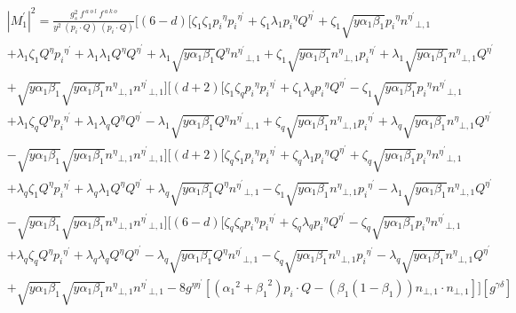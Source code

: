 \begin{equation}
\begin{split}
&{|{M}^{\prime}_1|}^2 =\frac{g_s^2 \:f^{\:a\:o\:l}\: f^{\:a\:k\:o}}{y^2\:(p_i\cdot Q) \:(p_i\cdot Q)} 
[(6-d)[\zeta_1 \zeta_1 {p_i}^{\eta}{p_i}^{{\eta}^{\prime}}+\zeta_1 \lambda_1{p_i}^{\eta}{Q}^{{\eta}^{\prime}}+\zeta_1\sqrt{y\alpha_1\beta_1}{p_i}^{\eta}{n^{{\eta}^{\prime}}}_{\bot,1}\\
&+\lambda_1\zeta_1 {Q}^{\eta}{p_i}^{{\eta}^{\prime}}+\lambda_1\lambda_1{Q}^{\eta}{Q}^{{\eta}^{\prime}}+\lambda_1\sqrt{y\alpha_1\beta_1}{Q}^{\eta}{n^{{\eta}^{\prime}}}_{\bot,1}
+\zeta_1\sqrt{y\alpha_1\beta_1} {n^{{\eta}}}_{\bot,1}{p_i}^{{\eta}^{\prime}}+\lambda_1\sqrt{y\alpha_1\beta_1}{n^{{\eta}}}_{\bot,1}{Q}^{{\eta}^{\prime}}\\
&+\sqrt{y\alpha_1\beta_1}\sqrt{y\alpha_1\beta_1}{n^{{\eta}}}_{\bot,1}{n^{{\eta}^{\prime}}}_{\bot,1}]
[(d+2)[\zeta_1 \zeta_q {p_i}^{\eta}{p_i}^{{\eta}^{\prime}}+\zeta_1 \lambda_q{p_i}^{\eta}{Q}^{{\eta}^{\prime}}-\zeta_1\sqrt{y\alpha_1\beta_1}{p_i}^{\eta}{n^{{\eta}^{\prime}}}_{\bot,1}\\
&+\lambda_1\zeta_q {Q}^{\eta}{p_i}^{{\eta}^{\prime}}+\lambda_1\lambda_q{Q}^{\eta}{Q}^{{\eta}^{\prime}}-\lambda_1\sqrt{y\alpha_1\beta_1}{Q}^{\eta}{n^{{\eta}^{\prime}}}_{\bot,1}+\zeta_q\sqrt{y\alpha_1\beta_1} {n^{{\eta}}}_{\bot,1}{p_i}^{{\eta}^{\prime}}+\lambda_q\sqrt{y\alpha_1\beta_1}{n^{{\eta}}}_{\bot,1}{Q}^{{\eta}^{\prime}}\\
&-\sqrt{y\alpha_1\beta_1}\sqrt{y\alpha_1\beta_1}{n^{{\eta}}}_{\bot,1}{n^{{\eta}^{\prime}}}_{\bot,1}][(d+2)[\zeta_q \zeta_1 {p_i}^{\eta}{p_i}^{{\eta}^{\prime}}+\zeta_q \lambda_1{p_i}^{\eta}{Q}^{{\eta}^{\prime}}+\zeta_q\sqrt{y\alpha_1\beta_1}{p_i}^{\eta}{n^{{\eta}^{\prime}}}_{\bot,1}\\
&+\lambda_q\zeta_1 {Q}^{\eta}{p_i}^{{\eta}^{\prime}}+\lambda_q\lambda_1{Q}^{\eta}{Q}^{{\eta}^{\prime}}+\lambda_q\sqrt{y\alpha_1\beta_1}{Q}^{\eta}{n^{{\eta}^{\prime}}}_{\bot,1}-\zeta_1\sqrt{y\alpha_1\beta_1} {n^{{\eta}}}_{\bot,1}{p_i}^{{\eta}^{\prime}}-\lambda_1\sqrt{y\alpha_1\beta_1}{n^{{\eta}}}_{\bot,1}{Q}^{{\eta}^{\prime}}\\
&-\sqrt{y\alpha_1\beta_1}\sqrt{y\alpha_1\beta_1}{n^{{\eta}}}_{\bot,1}{n^{{\eta}^{\prime}}}_{\bot,1}][(6-d)[\zeta_q \zeta_q {p_i}^{\eta}{p_i}^{{\eta}^{\prime}}+\zeta_q \lambda_q{p_i}^{\eta}{Q}^{{\eta}^{\prime}}-\zeta_q\sqrt{y\alpha_1\beta_1}{p_i}^{\eta}{n^{{\eta}^{\prime}}}_{\bot,1}\\
&+\lambda_q\zeta_q {Q}^{\eta}{p_i}^{{\eta}^{\prime}}+\lambda_q\lambda_q{Q}^{\eta}{Q}^{{\eta}^{\prime}}-\lambda_q\sqrt{y\alpha_1\beta_1}{Q}^{\eta}{n^{{\eta}^{\prime}}}_{\bot,1}-\zeta_q\sqrt{y\alpha_1\beta_1} {n^{{\eta}}}_{\bot,1}{p_i}^{{\eta}^{\prime}}-\lambda_q\sqrt{y\alpha_1\beta_1}{n^{{\eta}}}_{\bot,1}{Q}^{{\eta}^{\prime}}\\
&+\sqrt{y\alpha_1\beta_1}\sqrt{y\alpha_1\beta_1}{n^{{\eta}}}_{\bot,1}{n^{{\eta}^{\prime}}}_{\bot,1}-8g^{{\eta}{{\eta}^{\prime}}}[({\alpha_1}^2+{\beta_1}^2) p_i \cdot Q - ({\beta_1}(1-\beta_1)){n}_{\bot,1}\cdot{n}_{\bot,1}]][g^{{\gamma}{{\delta}}}]
\end{split}
\end{equation}


